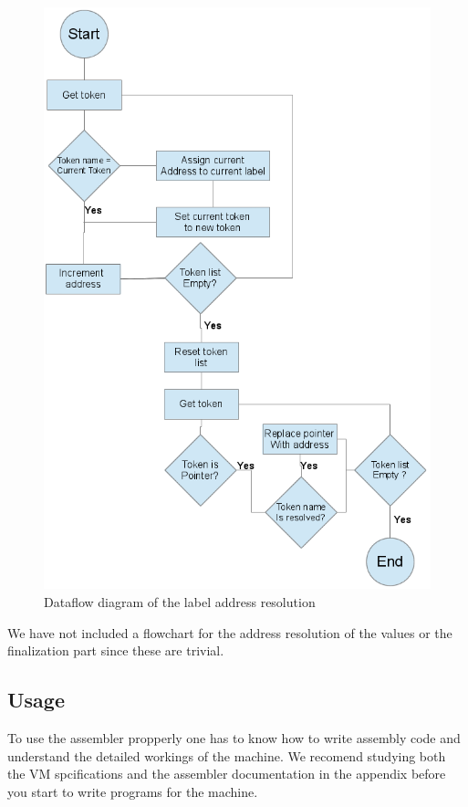 \documentclass{article}
\begin{document}
\begin{figure}[H]
\begin{centering}
\includegraphics[width=\textwidth,height=\textheight,keepaspectratio]{address.png}
\caption{Dataflow diagram of the label address resolution}
\end{centering}
\end{figure}
\newpage
We have not included a flowchart for the address resolution of the values or
the finalization part since these are trivial.
\subsection{Usage}  
To use the assembler propperly one has to know how to write assembly code and
understand the detailed workings of the machine. We recomend studying both the
VM spcifications and the assembler documentation in the appendix before you
start to write programs for the machine.
\end{document}
